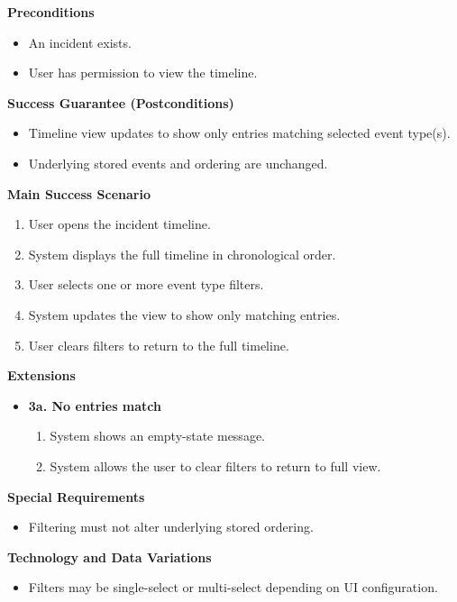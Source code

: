 \documentclass[11pt]{article}
\begin{document}
\textbf{Preconditions}
\begin{itemize}[nosep]
  \item An incident exists.
  \item User has permission to view the timeline.
\end{itemize}

\textbf{Success Guarantee (Postconditions)}
\begin{itemize}[nosep]
  \item Timeline view updates to show only entries matching selected event type(s).
  \item Underlying stored events and ordering are unchanged.
\end{itemize}

\textbf{Main Success Scenario}
\begin{enumerate}[nosep]
  \item User opens the incident timeline.
  \item System displays the full timeline in chronological order.
  \item User selects one or more event type filters.
  \item System updates the view to show only matching entries.
  \item User clears filters to return to the full timeline.
\end{enumerate}

\textbf{Extensions}
\begin{itemize}[nosep]
  \item \textbf{3a. No entries match}
    \begin{enumerate}[nosep]
      \item System shows an empty-state message.
      \item System allows the user to clear filters to return to full view.
    \end{enumerate}
\end{itemize}

\textbf{Special Requirements}
\begin{itemize}[nosep]
  \item Filtering must not alter underlying stored ordering.
\end{itemize}

\textbf{Technology and Data Variations}
\begin{itemize}[nosep]
  \item Filters may be single-select or multi-select depending on UI configuration.
\end{itemize}
\end{document}
